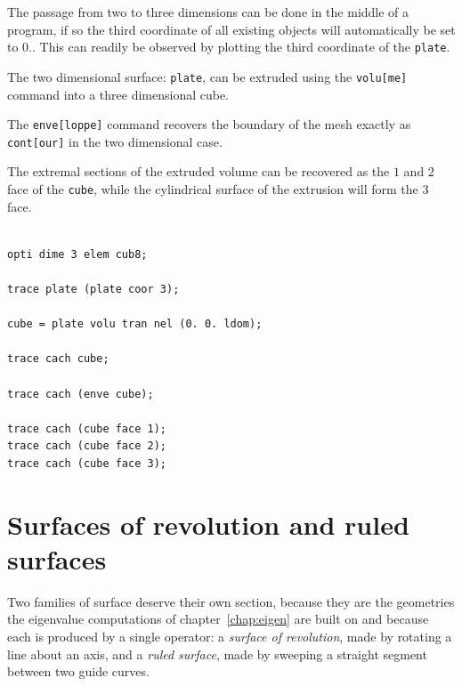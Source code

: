 \begin{castemcom}

The passage from two to three dimensions can be done 
in the middle of a program, if so the third coordinate 
of all existing objects will automatically be 
set to $0.$. This can readily be observed by plotting 
the third coordinate of the \texttt{plate}.  

The two dimensional surface: \texttt{plate},
can be extruded using the \texttt{volu[me]} 
command into a three dimensional cube.  

The \texttt{enve[loppe]} command recovers the 
boundary of the mesh exactly as \texttt{cont[our]} 
in the two dimensional case.

The extremal sections of the extruded volume 
can be recovered as the $1$ and $2$ face of the \texttt{cube},
while the cylindrical surface of the extrusion will form 
the $3$ face.  



\end{castemcom}
\begin{castemlines}
\begin{verbatim}

opti dime 3 elem cub8;

trace plate (plate coor 3);

cube = plate volu tran nel (0. 0. ldom);

trace cach cube;

trace cach (enve cube);

trace cach (cube face 1);
trace cach (cube face 2);
trace cach (cube face 3);

\end{verbatim}
\end{castemlines}


\section{Surfaces of revolution and ruled surfaces}
\label{sec:mesh:revolution}

%
%
%
Two families of surface deserve their own section, because they are the
geometries the eigenvalue computations of chapter~\ref{chap:eigen} are built
on and because each is produced by a single operator: a \emph{surface of
revolution}, made by rotating a line about an axis, and a \emph{ruled
surface}, made by sweeping a straight segment between two guide curves.

